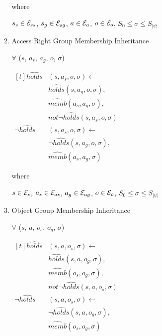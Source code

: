 \documentclass[global,twocolumn,draft]{svjour}
\begin{document}
\begin{itemize}
\begin{enumerate}
                  where

                  $s_{s} \in {\cal E}_{ss}$,
                  $s_{g} \in {\cal E}_{sg}$,
                  $a \in {\cal E}_{a}$,
                  $o \in {\cal E}_{o}$,
                  $S_{0}{\leq}{\sigma}{\leq}S_{|\psi|}$
 
                \item
                  Access Right Group Membership Inheritance
 
                  $\forall$ ($s$, $a_{s}$, $a_{g}$, $o$, $\sigma$)

                  \begin{math}
                    \begin{aligned}[t]
                      \hat{holds}&(s, a_{s}, o, \sigma) \leftarrow \\
                      & \hat{holds}(s, a_{g}, o, \sigma), \\
                      & \hat{memb}(a_{s}, a_{g}, \sigma), \\
                      & not \lnot \hat{holds}(s, a_{s}, o, \sigma) \\
                      \lnot \hat{holds}&(s, a_{s}, o, \sigma) \leftarrow \\
                      & \lnot \hat{holds}(s, a_{g}, o, \sigma), \\
                      & \hat{memb}(a_{s}, a_{g}, \sigma)
                    \end{aligned}
                  \end{math}

                  where
 
                  $s \in {\cal E}_{s}$,
                  $a_{s} \in {\cal E}_{as}$,
                  $a_{g} \in {\cal E}_{ag}$,
                  $o \in {\cal E}_{o}$,
                  $S_{0}{\leq}{\sigma}{\leq}S_{|\psi|}$
 
                \item
                  Object Group Membership Inheritance
 
                  $\forall$ ($s$, $a$, $o_{s}$, $o_{g}$, $\sigma$)

                  \begin{math}
                    \begin{aligned}[t]
                      \hat{holds}&(s, a, o_{s}, \sigma) \leftarrow \\
                      & \hat{holds}(s, a, o_{g}, \sigma), \\
                      & \hat{memb}(o_{s}, o_{g}, \sigma), \\
                      & not \lnot \hat{holds}(s, a, o_{s}, \sigma) \\
                      \lnot \hat{holds}&(s, a, o_{s}, \sigma) \leftarrow \\
                      & \lnot \hat{holds}(s, a, o_{g}, \sigma), \\
                      & \hat{memb}(o_{s}, o_{g}, \sigma)
                    \end{aligned}
                  \end{math}


\end{enumerate}
\end{itemize}
\end{document}
